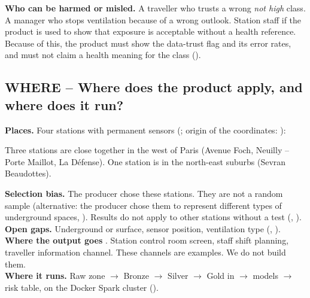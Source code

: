 \documentclass[11pt]{article}
\begin{document}
\textbf{Who can be harmed or misled.}
A traveller who trusts a wrong \emph{not high} class.
A manager who stops ventilation because of a wrong outlook.
Station staff if the product is used to show that exposure is acceptable without a health reference.
Because of this, the product must show the data-trust flag and its error rates, and must not claim a health meaning for the class ().

\subsection{WHERE -- Where does the product apply, and where does it run?}
\textbf{Places.} Four stations with permanent sensors \tObserved{} (; origin of the coordinates: ):

\begin{center}
\end{center}

Three stations are close together in the west of Paris (Avenue Foch, Neuilly -- Porte Maillot, La Défense). One station is in the north-east suburbs (Sevran Beaudottes).

\textbf{Selection bias.} The producer chose these stations. They are not a random sample \tInterp{} (alternative: the producer chose them to represent different types of underground spaces, ). Results do not apply to other stations without a test (, ).\\
\textbf{Open gaps.} Underground or surface, sensor position, ventilation type (, ).\\
\textbf{Where the output goes} \tAssumed. Station control room screen, staff shift planning, traveller information channel. These channels are examples. We do not build them.\\
\textbf{Where it runs.} Raw zone  $\rightarrow$ Bronze $\rightarrow$ Silver $\rightarrow$ Gold in  $\rightarrow$ models $\rightarrow$ risk table, on the Docker Spark cluster ().
\end{document}
